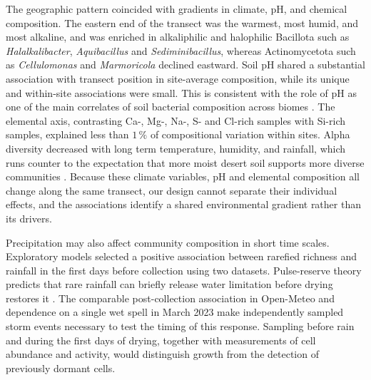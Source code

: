 \documentclass[fleqn,10pt,numbers]{olplainarticle}
\begin{document}
The geographic pattern coincided with gradients in climate, pH, and chemical composition. The eastern end of the transect was the warmest, most humid, and most alkaline, and was enriched in alkaliphilic and halophilic Bacillota such as \textit{Halalkalibacter}, \textit{Aquibacillus} and \textit{Sediminibacillus}, whereas Actinomycetota such as \textit{Cellulomonas} and \textit{Marmoricola} declined eastward. Soil pH shared a substantial association with transect position in site-average composition, while its unique and within-site associations were small. This is consistent with the role of pH as one of the main correlates of soil bacterial composition across biomes \cite{fierer2006diversity}. The elemental axis, contrasting Ca-, Mg-, Na-, S- and Cl-rich samples with Si-rich samples, explained less than $1\,\%$ of compositional variation within sites. Alpha diversity decreased with long term temperature, humidity, and rainfall, which runs counter to the expectation that more moist desert soil supports more diverse communities \cite{xiao2023influence}. Because these climate variables, pH and elemental composition all change along the same transect, our design cannot separate their individual effects, and the associations identify a shared environmental gradient rather than its drivers.

Precipitation may also affect community composition in short time scales. Exploratory models selected a positive association between rarefied richness and rainfall in the first days before collection using two datasets. Pulse-reserve theory predicts that rare rainfall can briefly release water limitation before drying restores it \cite{noymeir1973desert,schwinning2004pulse}. The comparable post-collection association in Open-Meteo and dependence on a single wet spell in March 2023 make independently sampled storm events necessary to test the timing of this response. Sampling before rain and during the first days of drying, together with measurements of cell abundance and activity, would distinguish growth from the detection of previously dormant cells.
\end{document}
